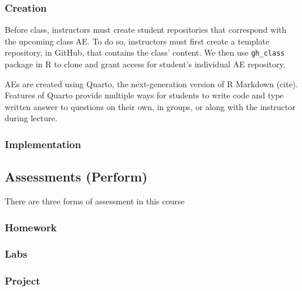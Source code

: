 \documentclass[
  12pt]{article}
\begin{document}
\hypertarget{creation}{%
\subsubsection{Creation}\label{creation}}

Before class, instructors must create student repositories that
correspond with the upcoming class AE. To do so, instructors must first
create a template repository, in GitHub, that contains the class'
content. We then use \texttt{gh\_class} package in R to clone and grant
access for student's individual AE repository.

AEs are created using Quarto, the next-generation version of R Markdown
(cite). Features of Quarto provide multiple ways for students to write
code and type written answer to questions on their own, in groups, or
along with the instructor during lecture.

\hypertarget{implementation}{%
\subsubsection{Implementation}\label{implementation}}

\hypertarget{assessments-perform}{%
\subsection{Assessments (Perform)}\label{assessments-perform}}

There are three forms of assessment in this course

\hypertarget{homework}{%
\subsubsection{Homework}\label{homework}}

\hypertarget{labs}{%
\subsubsection{Labs}\label{labs}}

\hypertarget{project}{%
\subsubsection{Project}\label{project}}


\renewcommand\refname{Discussion}
  
\end{document}
